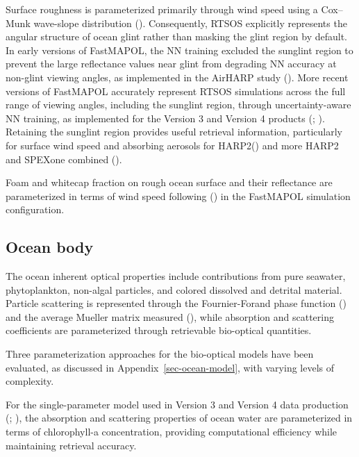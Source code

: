\documentclass[
  11pt,
  letterpaper,
]{scrreprt}
\begin{document}
Surface roughness is parameterized primarily through wind speed using a
Cox--Munk wave-slope distribution (). Consequently, RTSOS explicitly represents the angular
structure of ocean glint rather than masking the glint region by
default. In early versions of FastMAPOL, the NN training excluded the
sunglint region to prevent the large reflectance values near glint from
degrading NN accuracy at non-glint viewing angles, as implemented in the
AirHARP study (). More recent
versions of FastMAPOL accurately represent RTSOS simulations across the
full range of viewing angles, including the sunglint region, through
uncertainty-aware NN training, as implemented for the Version 3 and
Version 4 products (;
). Retaining the sunglint
region provides useful retrieval information, particularly for surface
wind speed and absorbing aerosols for
HARP2() and more HARP2 and
SPEXone combined ().

Foam and whitecap fraction on rough ocean surface and their reflectance
are parameterized in terms of wind speed following
() in the FastMAPOL simulation
configuration.

\subsection{Ocean body}\label{ocean-body}

The ocean inherent optical properties include contributions from pure
seawater, phytoplankton, non-algal particles, and colored dissolved and
detrital material. Particle scattering is represented through the
Fournier-Forand phase function () and the average Mueller matrix measured
(), while absorption and
scattering coefficients are parameterized through retrievable
bio-optical quantities.

Three parameterization approaches for the bio-optical models have been
evaluated, as discussed in Appendix~\ref{sec-ocean-model}, with varying
levels of complexity.

For the single-parameter model used in Version 3 and Version 4 data
production (;
), the absorption and
scattering properties of ocean water are parameterized in terms of
chlorophyll-a concentration, providing computational efficiency while
maintaining retrieval accuracy.
\end{document}
